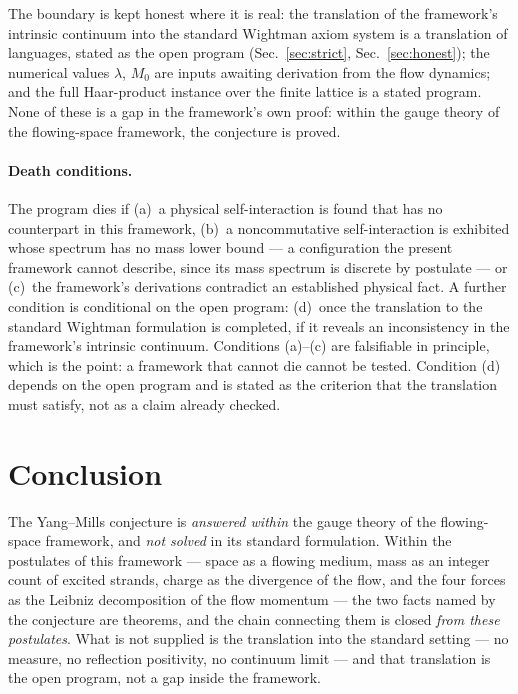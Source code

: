 \documentclass[aps,prd,preprint,superscriptaddress,amsmath,amssymb]{revtex4-2}
\begin{document}
The boundary is kept honest where it is real: the translation of the
framework's intrinsic continuum into the standard Wightman axiom
system is a translation of languages, stated as the open program
(Sec.~\ref{sec:strict}, Sec.~\ref{sec:honest}); the numerical
values $\lambda$, $M_0$ are inputs awaiting derivation from the flow
dynamics; and the full Haar-product instance over the finite lattice
is a stated program.  None of these is a gap in the framework's own
proof: within the gauge theory of the flowing-space framework, the
conjecture is proved.

\paragraph{Death conditions.}
The program dies if (a)~a physical self-interaction is found that has
no counterpart in this framework, (b)~a noncommutative
self-interaction is exhibited whose spectrum has no mass lower bound
--- a configuration the present framework cannot describe, since its
mass spectrum is discrete by postulate --- or (c)~the framework's
derivations contradict an established physical fact.  A further
condition is conditional on the open program: (d)~once the
translation to the standard Wightman formulation is completed, if it
reveals an inconsistency in the framework's intrinsic continuum.
Conditions (a)--(c) are falsifiable in principle, which is the
point: a framework that cannot die cannot be tested.  Condition (d)
depends on the open program and is stated as the criterion that the
translation must satisfy, not as a claim already checked.

\section{Conclusion}
\label{sec:conclusion}

The Yang--Mills conjecture is \emph{answered within} the gauge theory of
the flowing-space framework, and \emph{not solved} in its standard
formulation.  Within the postulates of this framework ---
space as a flowing medium, mass as an integer count of excited
strands, charge as the divergence of the flow, and the four forces
as the Leibniz decomposition of the flow momentum --- the two facts
named by the conjecture are theorems, and the chain connecting them
is closed \emph{from these postulates}.  What is not supplied is the
translation into the standard setting --- no measure, no reflection
positivity, no continuum limit --- and that translation is the open
program, not a gap inside the framework.
\end{document}
